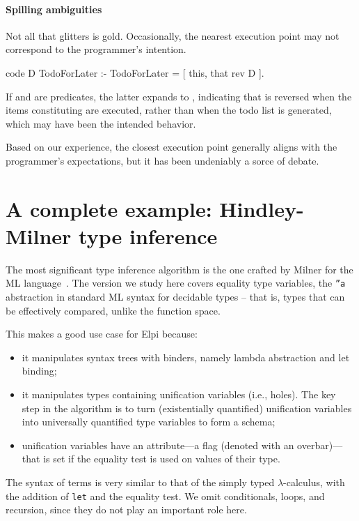 \documentclass[a4paper, 11pt]{book}
\begin{document}
\paragraph{Spilling ambiguities}

Not all that glitters is gold. Occasionally, the nearest execution point may not
correspond to the programmer's intention.

\begin{elpicode}
  code D TodoForLater  :-
    TodoForLater = [ this, that {rev D} ].
\end{elpicode}

If  and  are predicates, the latter expands to
, indicating that  is reversed when
the items constituting  are executed, rather than when
the todo list is generated, which may have been the intended behavior.

Based on our experience, the closest execution point generally aligns with
the programmer's expectations, but it has been undeniably a sorce of debate.

\section{A complete example: Hindley-Milner type inference}\label{sec:milner}


The most significant type inference algorithm is the one crafted by Milner
for the ML language~\cite{MILNER1978348}. The version we study here covers
equality type variables, the \texttt{''a} abstraction in standard ML syntax
for decidable types -- that is, types that can be effectively compared, unlike
the function space.

This makes a good use case for Elpi because:
\begin{itemize}
  \item it manipulates syntax trees with binders, namely lambda abstraction
    and let binding;
  \item it manipulates types containing unification variables (i.e., holes).
    The key step in the algorithm is to turn (existentially quantified)
    unification variables into universally quantified type variables to form a
    schema;
  \item unification variables have an attribute—a flag (denoted with an
    overbar)—that is set if the equality test is used on values of their type.
\end{itemize}

The syntax of terms is very similar to that of the simply typed
$\lambda$-calculus, with the addition of \texttt{let} and the equality test.
We omit conditionals, loops, and recursion, since they do not play an
important role here.
\end{document}
